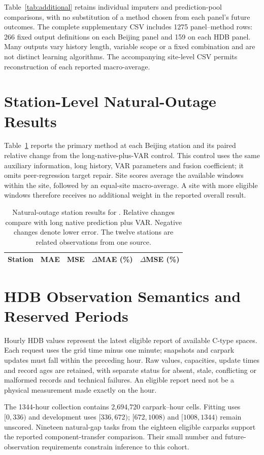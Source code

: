 Table~\ref{tab:additional} retains individual imputers and prediction-pool comparisons, with no substitution of a method chosen from each panel's future outcomes. The complete supplementary CSV includes 1275 panel--method rows: 266 fixed output definitions on each Beijing panel and 159 on each HDB panel. Many outputs vary history length, variable scope or a fixed combination and are not distinct learning algorithms. The accompanying site-level CSV permits reconstruction of each reported macro-average.

\section{Station-Level Natural-Outage Results}
\label{app:stations}

Table~\ref{tab:stations} reports the primary method at each Beijing station and its paired relative change from the long-native-plus-VAR control. This control uses the same auxiliary information, long history, VAR parameters and fusion coefficient; it omits peer-regression target repair. Site scores average the available windows within the site, followed by an equal-site macro-average. A site with more eligible windows therefore receives no additional weight in the reported overall result.

\begin{table}[h]
\caption{Natural-outage station results for \method{}. Relative changes compare with long native prediction plus VAR. Negative changes denote lower error. The twelve stations are related observations from one source.}
\label{tab:stations}
\centering\small
\begin{tabular}{lrrrr}
\toprule
Station & MAE & MSE & $\Delta$MAE (\%) & $\Delta$MSE (\%)\\
\midrule

\end{tabular}
\end{table}

\section{HDB Observation Semantics and Reserved Periods}
\label{app:hdb}

Hourly HDB values represent the latest eligible report of available C-type spaces. Each request uses the grid time minus one minute; snapshots and carpark updates must fall within the preceding hour. Raw values, capacities, update times and record ages are retained, with separate status for absent, stale, conflicting or malformed records and technical failures. An eligible report need not be a physical measurement made exactly on the hour.

The 1344-hour collection contains 2,694,720 carpark--hour cells. Fitting uses $[0,336)$ and development uses $[336,672)$; $[672,1008)$ and $[1008,1344)$ remain unscored. Nineteen natural-gap tasks from the eighteen eligible carparks support the reported component-transfer comparison. Their small number and future-observation requirements constrain inference to this cohort.
